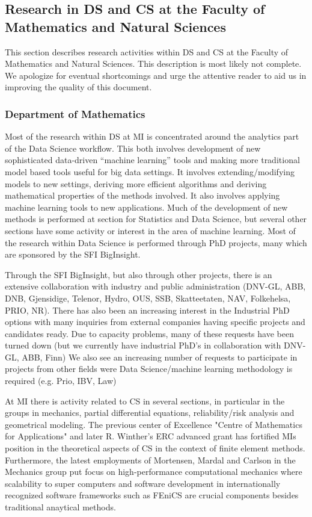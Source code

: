 \documentclass[a4paper,10pt]{article}
\begin{document}
\newpage
\subsection{Research in DS and CS at the Faculty of Mathematics and Natural Sciences}
This section describes research activities within DS and CS at the Faculty of Mathematics and Natural Sciences. This description is most likely not complete. We apologize for eventual shortcomings and urge the attentive reader to aid us in improving the quality of this document. 
\subsubsection*{Department of Mathematics}
Most of the research within DS at MI is concentrated around the analytics part of the Data Science workflow. This both involves development of new sophisticated data-driven “machine learning” tools and making more traditional model based tools useful for big data settings. It involves extending/modifying models to new settings, deriving more efficient algorithms and deriving mathematical properties of the methods involved. It also involves applying machine learning tools to new applications. Much of the development of new methods is performed at section for Statistics and Data Science, but several other sections have some activity or interest in the area of machine learning. 
Most of the research within Data Science is performed through PhD projects, many which are sponsored by the SFI BigInsight. 

Through the SFI BigInsight, but also through other projects, there is an extensive collaboration with industry and public administration (DNV-GL, ABB, DNB, Gjensidige, Telenor, Hydro, OUS, SSB, Skatteetaten, NAV, Folkehelsa, PRIO, NR).
There has also been an increasing interest in the Industrial PhD options with many inquiries from external companies having specific projects and candidates ready. Due to capacity problems, many of these requests have been turned down (but we currently have industrial PhD's in collaboration with DNV-GL, ABB, Finn)
We also see an increasing number of requests to participate in projects from other fields were Data Science/machine learning methodology is required (e.g. Prio, IBV, Law) 

At MI there is activity related to CS in several sections, in particular in the groups in mechanics, partial differential equations, reliability/risk analysis and geometrical modeling. 
The previous center of Excellence "Centre of Mathematics for Applications" 
and later R. Winther's ERC advanced grant  has fortified MIs position in the theoretical aspects of CS in 
the context of finite element methods.  Furthermore, the latest employments of Mortensen, Mardal and Carlson 
in the Mechanics group put focus on high-performance computational mechanics where scalability to super computers 
and software development in internationally recognized software frameworks such as FEniCS are crucial
components besides traditional anaytical methods.  
\end{document}
